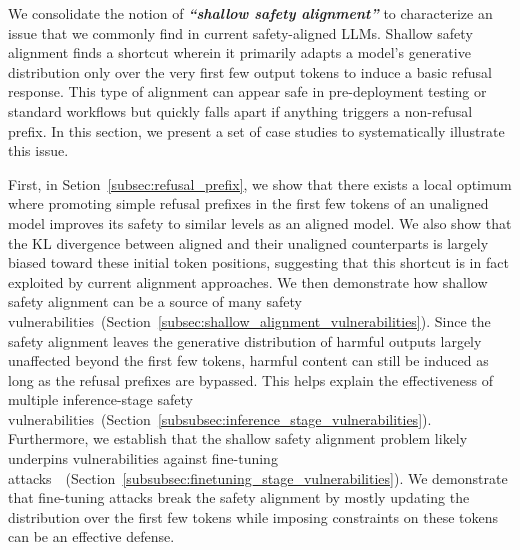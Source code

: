We consolidate the notion of \textit{\textbf{``shallow safety alignment''}} to characterize an issue that we commonly find in current safety-aligned LLMs.
Shallow safety alignment finds a shortcut wherein it primarily adapts a model's generative distribution only over the very first few output tokens to induce a basic refusal response.
This type of alignment can appear safe in pre-deployment testing or standard workflows but quickly falls apart if anything triggers a non-refusal prefix. In this section, we present a set of case studies to systematically illustrate this issue.


First, in Setion~\ref{subsec:refusal_prefix}, we show that there exists a local optimum where promoting simple refusal prefixes in the first few tokens of an unaligned model improves its safety to similar levels as an aligned model. 
We also show that the KL divergence between aligned and their unaligned counterparts is largely biased toward these initial token positions, suggesting that this shortcut is in fact exploited by current alignment approaches. 
We then demonstrate how shallow safety alignment can be a source of many safety vulnerabilities~(Section~\ref{subsec:shallow_alignment_vulnerabilities}). Since the safety alignment leaves the generative distribution of harmful outputs largely unaffected beyond the first few tokens, harmful content can still be induced as long as the refusal prefixes are bypassed. This helps explain the effectiveness of  multiple inference-stage safety vulnerabilities~(Section~\ref{subsubsec:inference_stage_vulnerabilities}). Furthermore, we establish that the shallow safety alignment problem likely underpins vulnerabilities against fine-tuning attacks~\citep{qi2023fine}~(Section~\ref{subsubsec:finetuning_stage_vulnerabilities}). We demonstrate that fine-tuning attacks break the safety alignment by mostly updating the distribution over the first few tokens while imposing constraints on these tokens can be an effective defense.

